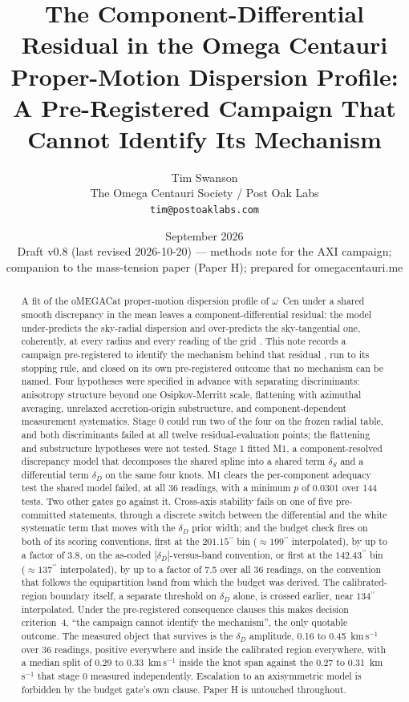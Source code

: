 \documentclass[11pt]{article}
\title{\textbf{The Component-Differential Residual in the Omega Centauri Proper-Motion Dispersion Profile: A Pre-Registered Campaign That Cannot Identify Its Mechanism}}
\author{Tim Swanson\\[2pt]
\small The Omega Centauri Society / Post Oak Labs\\
\small \texttt{tim@postoaklabs.com}}
\date{September 2026 \\[4pt] \small Draft v0.8 (last revised 2026-10-20) --- methods note for the AXI campaign;\\ \small companion to the mass-tension paper (Paper H); prepared for omegacentauri.me}
\newcommand{\ocen}{$\omega$~Cen}
\newcommand{\as}{\ensuremath{^{\prime\prime}}}
\newcommand{\dD}{\ensuremath{\delta_D}}
\newcommand{\dS}{\ensuremath{\delta_S}}
\begin{document}
\maketitle

\begin{abstract}
\noindent
A fit of the oMEGACat proper-motion dispersion profile of \ocen{} under a shared smooth discrepancy in the mean leaves a component-differential residual: the model under-predicts the sky-radial dispersion and over-predicts the sky-tangential one, coherently, at every radius and every reading of the grid \citep{HFit2Report2026}. This note records a campaign pre-registered to identify the mechanism behind that residual \citep{AXIPrereg2026}, run to its stopping rule, and closed on its own pre-registered outcome that no mechanism can be named. Four hypotheses were specified in advance with separating discriminants: anisotropy structure beyond one Osipkov-Merritt scale, flattening with azimuthal averaging, unrelaxed accretion-origin substructure, and component-dependent measurement systematics. Stage 0 could run two of the four on the frozen radial table, and both discriminants failed at all twelve residual-evaluation points; the flattening and substructure hypotheses were not tested. Stage 1 fitted M1, a component-resolved discrepancy model that decomposes the shared spline into a shared term \dS{} and a differential term \dD{} on the same four knots. M1 clears the per-component adequacy test the shared model failed, at all 36 readings, with a minimum $p$ of 0.0301 over 144 tests. Two other gates go against it. Cross-axis stability fails on one of five pre-committed statements, through a discrete switch between the differential and the white systematic term that moves with the \dD{} prior width; and the budget check fires on both of its scoring conventions, first at the $201.15\as$ bin ($\approx199\as$ interpolated), by up to a factor of 3.8, on the as-coded $|\dD|$-versus-band convention, or first at the $142.43\as$ bin ($\approx137\as$ interpolated), by up to a factor of 7.5 over all 36 readings, on the convention that follows the equipartition band from which the budget was derived. The calibrated-region boundary itself, a separate threshold on \dD{} alone, is crossed earlier, near $134\as$ interpolated. Under the pre-registered consequence clauses this makes decision criterion~4, ``the campaign cannot identify the mechanism'', the only quotable outcome. The measured object that survives is the \dD{} amplitude, 0.16 to 0.45~km\,s$^{-1}$ over 36 readings, positive everywhere and inside the calibrated region everywhere, with a median split of 0.29 to 0.33~km\,s$^{-1}$ inside the knot span against the 0.27 to 0.31~km\,s$^{-1}$ that stage 0 measured independently. Escalation to an axisymmetric model is forbidden by the budget gate's own clause. Paper H is untouched throughout.
\end{abstract}
\end{document}
